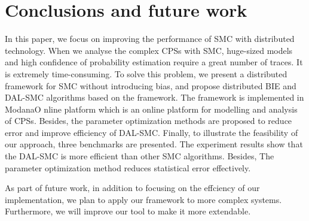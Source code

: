 \section{Conclusions and future work}
In this paper, we focus on improving the performance of SMC with distributed technology. When we analyse the complex CPSs with SMC, huge-sized models and high confidence of probability estimation require a great number of traces. It is extremely time-consuming. To solve this problem, we present a distributed framework for SMC without introducing bias, and propose distributed BIE and DAL-SMC algorithms based on the framework. The framework is implemented in ModanaO
nline platform which is an online platform for modelling and analysis of CPSs. Besides, the parameter optimization methods are proposed to reduce error and improve efficiency of DAL-SMC. Finally, to illustrate the feasibility of our approach, three benchmarks are presented. The experiment results show that the DAL-SMC is more efficient than other SMC algorithms. Besides, The parameter optimization method reduces statistical error effectively. 

As part of future work, in addition to focusing on the effciency of our implementation, we plan to apply our framework to more complex systems. Furthermore, we will improve our tool to make it more extendable.



